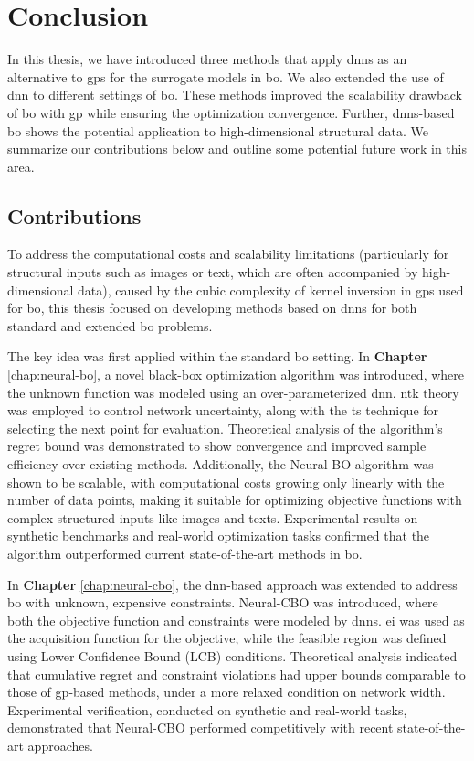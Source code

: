 \chapter{Conclusion} %

\label{chap:conclusion} %

In this thesis, we have introduced three methods that apply \acp{dnn} as an alternative to \acp{gp} for the surrogate models in \ac{bo}. We also extended the use of \ac{dnn} to different settings of \ac{bo}. These methods improved the scalability drawback of \ac{bo} with \ac{gp} while ensuring the optimization convergence. Further, \acp{dnn}-based \acl{bo} shows the potential application to high-dimensional structural data. We summarize our
contributions below and outline some potential future work in this area. 

\section{Contributions}
To address the computational costs and scalability limitations (particularly for structural inputs such as images or text, which are often accompanied by high-dimensional data), caused by the cubic complexity of kernel inversion in \acp{gp} used for \ac{bo}, this thesis focused on developing methods based on \acp{dnn} for both standard and extended \ac{bo} problems.

The key idea was first applied within the standard \ac{bo} setting. In \textbf{Chapter} \ref{chap:neural-bo}, a novel black-box optimization algorithm was introduced, where the unknown function was modeled using an over-parameterized \ac{dnn}. \ac{ntk} theory was employed to control network uncertainty, along with the \ac{ts} technique for selecting the next point for evaluation. Theoretical analysis of the algorithm's regret bound was demonstrated to show convergence and improved sample efficiency over existing methods. Additionally, the Neural-BO algorithm was shown to be scalable, with computational costs growing only linearly with the number of data points, making it suitable for optimizing objective functions with complex structured inputs like images and texts. Experimental results on synthetic benchmarks and real-world optimization tasks confirmed that the algorithm outperformed current state-of-the-art methods in \ac{bo}. 

In \textbf{Chapter} \ref{chap:neural-cbo}, the \ac{dnn}-based approach was extended to address \ac{bo} with unknown, expensive constraints. Neural-CBO was introduced, where both the objective function and constraints were modeled by \acp{dnn}. \ac{ei} was used as the acquisition function for the objective, while the feasible region was defined using Lower Confidence Bound (LCB) conditions. Theoretical analysis indicated that cumulative regret and constraint violations had upper bounds comparable to those of \ac{gp}-based methods, under a more relaxed condition on network width. Experimental verification, conducted on synthetic and real-world tasks, demonstrated that Neural-CBO performed competitively with recent state-of-the-art approaches. 

